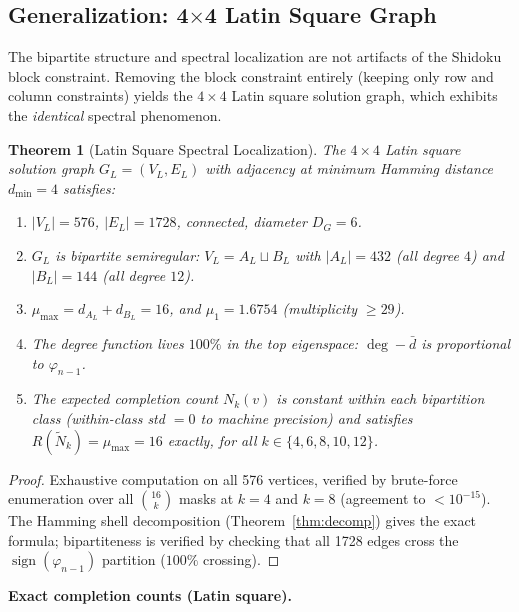 \documentclass[11pt]{article}
\newtheorem{theorem}{Theorem}[section]
\theoremstyle{definition}
\theoremstyle{remark}
\begin{document}
\subsection{Generalization: 4$\times$4 Latin Square Graph}\label{sec:latin}

The bipartite structure and spectral localization are not artifacts of the Shidoku block constraint. Removing the block constraint entirely (keeping only row and column constraints) yields the $4 \times 4$ Latin square solution graph, which exhibits the \emph{identical} spectral phenomenon.

\begin{theorem}[Latin Square Spectral Localization]\label{thm:latin_loc}
The $4 \times 4$ Latin square solution graph $G_L = (V_L, E_L)$ with adjacency at minimum Hamming distance $d_{\min} = 4$ satisfies:
\begin{enumerate}[nosep, label=(\roman*)]
\item $|V_L| = 576$, $|E_L| = 1728$, connected, diameter $D_G = 6$.
\item $G_L$ is bipartite semiregular: $V_L = A_L \sqcup B_L$ with $|A_L| = 432$ (all degree $4$) and $|B_L| = 144$ (all degree $12$).
\item $\mu_{\max} = d_{A_L} + d_{B_L} = 16$, and $\mu_1 = 1.6754$ (multiplicity $\ge 29$).
\item The degree function lives $100\%$ in the top eigenspace: $\deg - \bar{d}$ is proportional to $\varphi_{n-1}$.
\item The expected completion count $N_k(v)$ is constant within each bipartition class (within-class std $= 0$ to machine precision) and satisfies $R(\tilde{N}_k) = \mu_{\max} = 16$ exactly, for all $k \in \{4, 6, 8, 10, 12\}$.
\end{enumerate}
\end{theorem}

\begin{proof}
Exhaustive computation on all 576 vertices, verified by brute-force enumeration over all $\binom{16}{k}$ masks at $k = 4$ and $k = 8$ (agreement to $< 10^{-15}$). The Hamming shell decomposition (Theorem~\ref{thm:decomp}) gives the exact formula; bipartiteness is verified by checking that all 1728 edges cross the $\operatorname{sign}(\varphi_{n-1})$ partition ($100\%$ crossing).
\end{proof}

\textbf{Exact completion counts (Latin square).}
\end{document}
